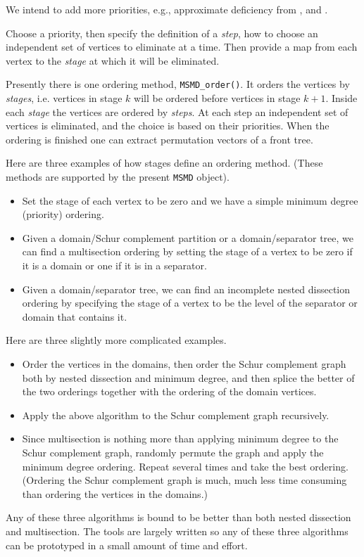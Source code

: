 We intend to add more priorities, 
e.g., approximate deficiency from
\cite{ng96-mindefIdaho},
\cite{rot96-mindefIdaho}
and \cite{rot98-mindef}.
\par
Choose a priority, then specify the definition of a {\it step},
how to choose an independent set of vertices to eliminate at a time.
Then provide a map from each vertex to the {\it stage} at which it
will be eliminated.
\par
Presently there is one ordering method, {\tt MSMD\_order()}.
It orders the vertices by {\it stages}, i.e. vertices in stage $k$ will
be ordered before vertices in stage $k+1$.
Inside each {\it stage} the vertices are ordered by {\it steps}.
At each step an independent set of vertices is eliminated, 
and the choice is based on their priorities.
When the ordering is finished one can extract permutation vectors
of a front tree.
\par
Here are three examples of how stages define an ordering method.
(These methods are supported by the present {\tt MSMD} object).
\begin{itemize}
\item
Set the stage of each vertex to be zero and we have a simple minimum
degree (priority) ordering.
\item
Given a domain/Schur complement partition or a domain/separator tree, 
we can find a multisection ordering by setting the stage of a vertex 
to be zero if it is a domain or one if it is in a separator.
\item
Given a domain/separator tree, we can find an incomplete nested
dissection ordering by specifying the stage of a vertex to be 
the level of the separator or domain that contains it.
\end{itemize}
Here are three slightly more complicated examples. 
\begin{itemize}
\item
Order the vertices in the domains, then order the
Schur complement graph both by nested dissection and minimum degree,
and then splice the better of the two orderings together with the
ordering of the domain vertices. 
\item
Apply the above algorithm to the Schur complement graph
recursively.
\item
Since multisection is nothing more than applying minimum degree to
the Schur complement graph, randomly permute the graph and apply
the minimum degree ordering. Repeat several times and take the best
ordering.
(Ordering the Schur complement graph is much, much less time
consuming than ordering the vertices in the domains.)
\end{itemize}
Any of these three algorithms is bound to be better than both nested
dissection and multisection.
The tools are largely written so any of these three algorithms can
be prototyped in a small amount of time and effort.
